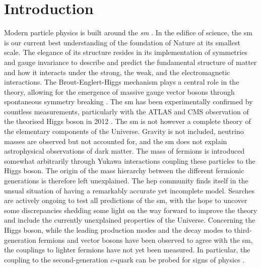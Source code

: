 \chapter{\color{oxfordblue} Introduction}
\ChapFrame

Modern particle physics is built around the \textit{\gls{sm}} \cite{Schwartz_2013, SMphysics}. In the edifice of science, the \gls{sm} is our current best understanding of the foundation of Nature at its smallest scale. The elegance of its structure resides in its implementation of symmetries and gauge invariance to describe and predict the fundamental structure of matter and how it interacts under the strong, the weak, and the electromagnetic interactions. The Brout-Englert-Higgs mechanism plays a central role in the theory, allowing for the emergence of massive gauge vector bosons through spontaneous symmetry breaking \cite{Englert:1964et,  PhysRevLett.13.508}. The \gls{sm} has been experimentally confirmed by countless measurements, particularly with the ATLAS and CMS observation of the theorised Higgs boson in 2012 \cite{ATLAS:2012yve, CMS:2012qbp}. The \gls{sm} is not however a complete theory of the elementary components of the Universe. Gravity is not included, neutrino masses are observed but not accounted for, and the \gls{sm} does not explain astrophysical observations of dark matter. The mass of fermions is introduced somewhat arbitrarily through Yukawa interactions coupling these particles to the Higgs boson. The origin of the mass hierarchy between the different fermionic generations is therefore left unexplained. The \gls{hep} community finds itself in the unsual situation of having a remarkably accurate yet incomplete model. Searches are actively ongoing to test all predictions of the \gls{sm}, with the hope to uncover some discrepancies shedding some light on the way forward to improve the theory and include the currently unexplained properties of the Universe. Concerning the Higgs boson, while the leading production modes and the decay modes to third-generation fermions and vector bosons have been observed to agree with the \gls{sm}, the couplings to lighter fermions have not yet been measured. In particular, the coupling to the second-generation $c$-quark can be probed for signs of physics  \cite{PhysRevD.89.033014,PhysRevD.92.033016,Botella:2016krk,PhysRevD.98.055001,GHOSH2016504,PhysRevLett.123.031802,PhysRevD.100.115041}. \\

